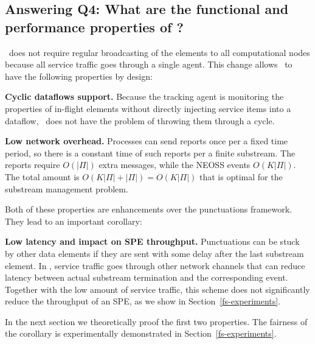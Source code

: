 \subsection{Answering Q4: What are the functional and performance properties of \tracker?}
\label{tracker-properties}

\tracker\ does not require regular broadcasting of the elements to all computational nodes because all service traffic goes through a single agent. This change allows \tracker\ to have the following properties by design:

{\bf Cyclic dataflows support.} Because the tracking agent is monitoring the properties of in-flight elements without directly injecting service items into a dataflow, \tracker\ does not have the problem of throwing them through a cycle.

{\bf Low network overhead.} Processes can send reports once per a fixed time period, so there is a constant time of such reports per a finite substream. The reports require $O(|\Pi|)$ extra messages, while the NEOSS events $O(K|\Pi|)$. The total amount is $O(K|\Pi| + |\Pi|) = O(K|\Pi|)$ that is optimal for the substream management problem.

Both of these properties are enhancements over the punctuations framework. They lead to an important corollary: 

{\bf Low latency and impact on SPE throughput.} Punctuations can be stuck by other data elements if they are sent with some delay after the last substream element. In \tracker, service traffic goes through other network channels that can reduce latency between actual substream termination and the corresponding event. Together with the low amount of service traffic, this scheme does not significantly reduce the throughput of an SPE, as we show in Section~\ref{fs-experiments}.

In the next section we theoretically proof the first two properties. The fairness of the corollary is experimentally demonstrated in Section~\ref{fs-experiments}.

